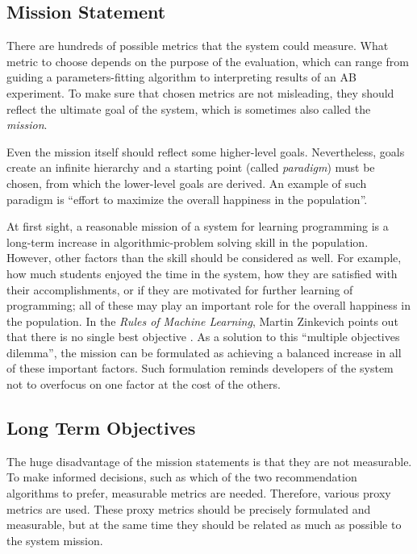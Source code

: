\subsection{Mission Statement}
\label{sec:mission}

There are hundreds of possible metrics that the system could measure.
What metric to choose depends on the purpose of the evaluation,
  which can range from guiding a parameters-fitting algorithm
  to interpreting results of an AB experiment.
To make sure that chosen metrics are not misleading,
  they should reflect the ultimate goal of the system,
  which is sometimes also called the \emph{mission}.

Even the mission itself should reflect some higher-level goals.
Nevertheless, goals create an infinite hierarchy
  and a starting point (called \emph{paradigm}) must be chosen,
  from which the lower-level goals are derived.
An example of such paradigm is
  ``effort to maximize the overall happiness in the population''.

At first sight, a reasonable mission of a system for learning programming
  is a long-term increase in algorithmic-problem solving skill in the population.
However, other factors than the skill should be considered as well.
For example, how much students enjoyed the time in the system,
  how they are satisfied with their accomplishments,
  or if they are motivated for further learning of programming;
  all of these may play an important role for the overall happiness in the population.
In the \emph{Rules of Machine Learning}, Martin Zinkevich
  points out that there is no single best objective \cite[][Rule \#39]{google-ml-rules}.
As a solution to this ``multiple objectives dilemma'',
  the mission can be formulated as achieving a balanced increase in all
  of these important factors.
Such formulation reminds developers of the system not to overfocus on one factor
  at the cost of the others.


\subsection{Long Term Objectives}
\label{sec:long-term-objectives}

The huge disadvantage of the mission statements
  is that they are not measurable.
To make informed decisions,
  such as which of the two recommendation algorithms to prefer,
  measurable metrics are needed.
Therefore, various proxy metrics are used.
These proxy metrics should be precisely formulated and measurable,
  but at the same time they should be related as much as possible to the system mission.

